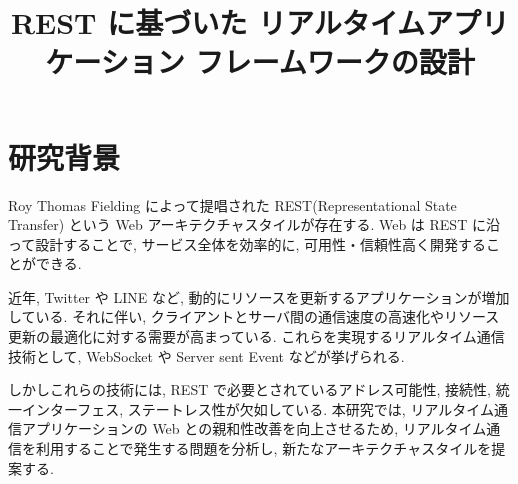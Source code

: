 \documentclass[a4j, 10pt, twocolumn]{ujarticle}
\begin{document}
\title{REST に基づいた 
リアルタイムアプリケーション
フレームワークの設計}{}

    
    \Email{}
    
    \Keyword{}
    \MKTITLE{}
    
    \renewcommand{\baselinestretch}{1.0}
    \setlength{\baselineskip}{1.5zh}
    \renewcommand{\textfraction}{0.1}
    \renewcommand{\floatsep}{1pt}
    \renewcommand{\intextsep}{4pt}
    \renewcommand{\textfloatsep}{4pt}
    
    \vspace{-20mm}
    
    
    \section{研究背景}
Roy Thomas Fielding によって提唱された REST(Representational State Transfer) という Web アーキテクチャスタイルが存在する.
Web は REST に沿って設計することで, サービス全体を効率的に, 可用性・信頼性高く開発することができる. 

近年, Twitter や LINE など, 動的にリソースを更新するアプリケーションが増加している.
それに伴い,  クライアントとサーバ間の通信速度の高速化やリソース更新の最適化に対する需要が高まっている.
これらを実現するリアルタイム通信技術として, WebSocket や Server sent Event などが挙げられる.

しかしこれらの技術には, REST で必要とされているアドレス可能性, 接続性, 統一インターフェス, ステートレス性が欠如している.
本研究では, リアルタイム通信アプリケーションの Web との親和性改善を向上させるため, リアルタイム通信を利用することで発生する問題を分析し, 新たなアーキテクチャスタイルを提案する. 




    
\end{document}
